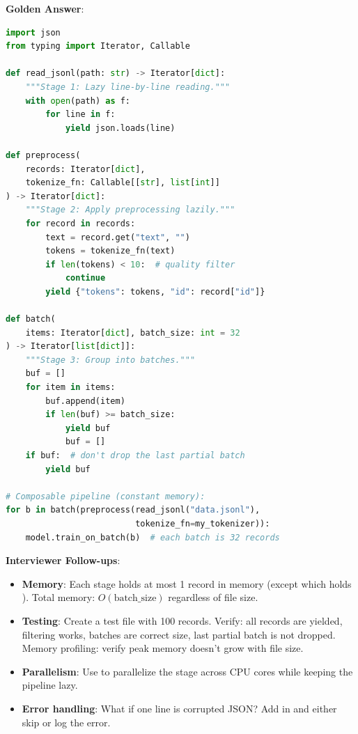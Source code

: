 \textbf{Golden Answer}:

\begin{lstlisting}[language=Python]
import json
from typing import Iterator, Callable

def read_jsonl(path: str) -> Iterator[dict]:
    """Stage 1: Lazy line-by-line reading."""
    with open(path) as f:
        for line in f:
            yield json.loads(line)

def preprocess(
    records: Iterator[dict],
    tokenize_fn: Callable[[str], list[int]]
) -> Iterator[dict]:
    """Stage 2: Apply preprocessing lazily."""
    for record in records:
        text = record.get("text", "")
        tokens = tokenize_fn(text)
        if len(tokens) < 10:  # quality filter
            continue
        yield {"tokens": tokens, "id": record["id"]}

def batch(
    items: Iterator[dict], batch_size: int = 32
) -> Iterator[list[dict]]:
    """Stage 3: Group into batches."""
    buf = []
    for item in items:
        buf.append(item)
        if len(buf) >= batch_size:
            yield buf
            buf = []
    if buf:  # don't drop the last partial batch
        yield buf

# Composable pipeline (constant memory):
for b in batch(preprocess(read_jsonl("data.jsonl"),
                          tokenize_fn=my_tokenizer)):
    model.train_on_batch(b)  # each batch is 32 records
\end{lstlisting}

\textbf{Interviewer Follow-ups}:
\begin{itemize}[leftmargin=*]
    \item \textbf{Memory}: Each stage holds at most 1 record in memory (except  which holds ). Total memory: $O(\text{batch\_size})$ regardless of file size.
    \item \textbf{Testing}: Create a test file with 100 records. Verify: all records are yielded, filtering works, batches are correct size, last partial batch is not dropped. Memory profiling: verify peak memory doesn't grow with file size.
    \item \textbf{Parallelism}: Use  to parallelize the  stage across CPU cores while keeping the pipeline lazy.
    \item \textbf{Error handling}: What if one line is corrupted JSON? Add  in  and either skip or log the error.
\end{itemize}

